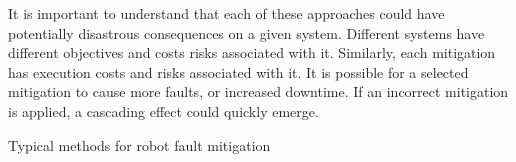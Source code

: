 It is important to understand that each of these approaches could have potentially disastrous consequences on a given system. Different systems have different objectives and costs risks associated with it. Similarly, each mitigation has execution costs and risks associated with it. It is possible for a selected mitigation to cause more faults, or increased downtime. If an incorrect mitigation is applied, a cascading effect could quickly emerge.

Typical methods for robot fault mitigation 

